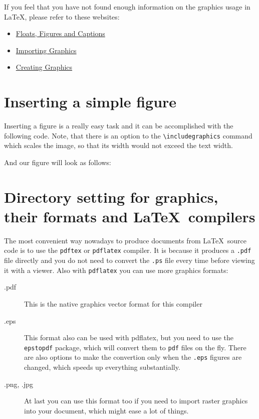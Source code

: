 If you feel that you have not found enough information on the graphics usage in
\LaTeX, please refer to these websites:
\begin{itemize}
    \item
        \href{https://secure.wikimedia.org/wikibooks/en/wiki/LaTeX/Floats,_Figures_and_Captions}{Floats,
        Figures and Captions}
    \item
        \href{https://secure.wikimedia.org/wikibooks/en/wiki/LaTeX/Importing_Graphics}{Importing
        Graphics}
    \item
        \href{https://secure.wikimedia.org/wikibooks/en/wiki/LaTeX/Creating_Graphics}{Creating
        Graphics}
\end{itemize}

\clearpage
\section{Inserting a simple figure}

Inserting a figure is a really easy task and it can be accomplished with the
following code. Note, that there is an option to the \verb|\includegraphics|
command which scales the image, so that its width would not exceed the text
width.

And our figure will look as follows:


\section{Directory setting for graphics, their formats and \LaTeX\ compilers}

The most convenient way nowadays to produce documents from \LaTeX\ source code
is to use the \verb|pdftex| or \verb|pdflatex| compiler. It is because it
produces a \verb|.pdf| file directly and you do not need to convert the
\verb|.ps| file every time before viewing it with a viewer. Also with
\verb|pdflatex| you can use more graphics formats:
\begin{description}
    \item[.pdf] This is the native graphics vector format for this compiler
    \item[.eps] This format also can be used with pdflatex, but you need to use
        the \verb|epstopdf| package, which will convert them to \verb|pdf| files
        on the fly. There are also options to make the convertion only when the
        \verb|.eps| figures are changed, which speeds up everything
        substantially.
    \item[.png, .jpg] At last you can use this format too if you need to import
        raster graphics into your document, which might ease a lot of things.
\end{description}

